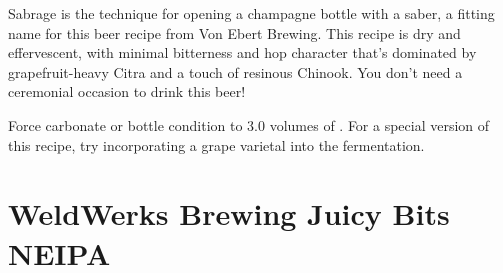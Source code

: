 \documentclass[10pt,oneside]{scrbook}
\begin{document}
\begin{aboutblock}
Sabrage is the technique for opening a champagne bottle with a saber, a fitting name for
this beer recipe from Von Ebert Brewing. This recipe is dry and effervescent, with minimal
bitterness and hop character that's dominated by grapefruit-heavy Citra and a touch of
resinous Chinook. You don't need a ceremonial occasion to drink this beer!
\end{aboutblock}


\begin{methodandtiming}
 
\begin{mashsteps}
\end{mashsteps}

\begin{fermentationsteps}
\end{fermentationsteps}

\begin{directions}
Force carbonate or bottle condition to 3.0 volumes of . For a special version of
this recipe, try incorporating a grape varietal into the fermentation.
\end{directions}

\end{methodandtiming}

\pagebreak

\begin{ingredientsblock}

\begin{malts}
\end{malts}

\begin{hops}
\end{hops}

\begin{yeasts}
\end{yeasts}

\end{ingredientsblock}

\chapter*{WeldWerks Brewing Juicy Bits NEIPA}
\end{document}
